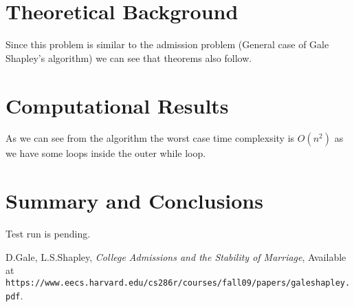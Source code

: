 \documentclass{article}
\begin{document}
\section{Theoretical Background}
Since this problem is similar to the admission problem (General case of Gale Shapley's algorithm) we can see that theorems also follow.


\section{Computational Results}
As we can see from the algorithm the worst case time complexsity is $O(n^2)$ as we have some loops inside the outer while loop.


\section{Summary and Conclusions}
Test run is pending.




\begin{thebibliography}{10}

 D.Gale, L.S.Shapley, 
\emph{College Admissions and the Stability of Marriage},
Available at \texttt{https://www.eecs.harvard.edu/cs286r/courses/fall09/papers/galeshapley.pdf}.


\end{thebibliography}
\end{document}
